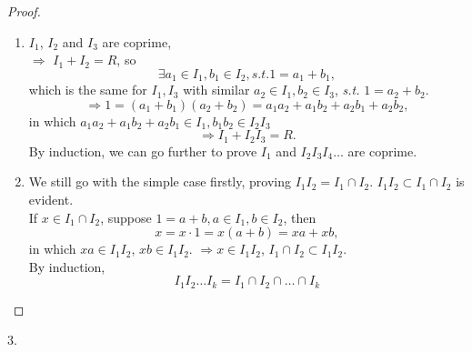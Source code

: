 \begin{proof}

    \begin{enumerate}[(1)]
        \item     $I_1$, $I_2$ and $I_3$ are coprime,\\
        $\Rightarrow$ $I_1+I_2=R$, so 
        $$\exists a_1\in I_1, b_1 \in I_2, \textit{s.t.} 1=a_1+b_1, $$
        which is the same for $I_1,I_3$ with similar $a_2\in I_1,b_2\in I_3$, \textit{s.t.} $1=a_2+b_2$.\\
        $$\Rightarrow 1=(a_1+b_1)(a_2+b_2)=a_1a_2+a_1b_2+a_2b_1+a_2b_2,$$
        in which $a_1a_2+a_1b_2+a_2b_1\in I_1, b_1b_2\in I_2I_3$
        $$\Rightarrow I_1+I_2I_3=R.$$
        By induction, we can go further to prove $I_1$ and $I_2I_3I_4\dots$ are coprime.
        \item We still go with the simple case firstly, proving $I_1I_2=I_1\cap I_2$. $I_1I_2\subset I_1\cap I_2$ is evident.\\
        If $x\in I_1\cap I_2$, suppose $1=a+b,a\in I_1,b\in I_2$, then 
        $$x=x\cdot 1=x(a+b)=xa+xb,$$ in which $xa\in I_1I_2$, $xb\in I_1I_2.$ $\Rightarrow x\in I_1I_2$, $I_1\cap I_2\subset I_1I_2.$\\
        By induction, 
        $$I_1I_2\dots I_k=I_1\cap I_2\cap \dots \cap I_k$$
    \end{enumerate}

\end{proof}

\begin{exercise}
3.
\end{exercise}


